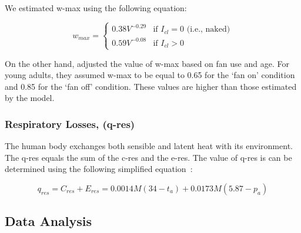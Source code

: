 We estimated \ac{w-max} using the following equation:

\begin{equation}
    w_{max}=
\begin{cases}
    0.38 V^{-0.29} & \text{if } I_{cl} = 0 \text{ (i.e., naked)} \\
    0.59 V^{-0.08} & \text{if } I_{cl} > 0
\end{cases}
\end{equation}

On the other hand,  adjusted the value of \ac{w-max} based on fan use and age.
For young adults, they assumed \ac{w-max} to be equal to 0.65 for the `fan on' condition and 0.85 for the `fan off' condition.
These values are higher than those estimated by the  model.

\subsubsection{Respiratory Losses, (\acs{q-res})}
The human body exchanges both sensible and latent heat with its environment.
The \acf{q-res} equals the sum of the \ac{c-res} and the \ac{e-res}.
The value of \ac{q-res} is can be determined using the following simplified equation~\cite{ASHRA2017}:

\begin{equation}
    q_{res} = C_{res} + E_{res} = 0.0014M(34-t_{a}) + 0.0173M(5.87-p_{a})\label{eq:respiratory-losses}
\end{equation}

\subsection{Data Analysis}\label{subsec:data-analysis}

